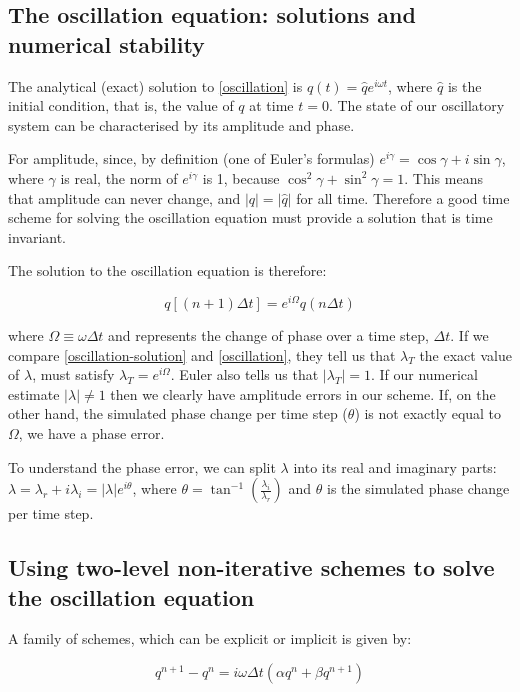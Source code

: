 \subsection{The oscillation equation: solutions and numerical stability}
The analytical (exact) solution to \ref{oscillation} is $q(t) = \hat{q} e^{i \omega t}$, where $\hat{q}$ is the initial condition, that is, the value of $q$ at time $t=0$. The state of our oscillatory system can be characterised by its amplitude and phase.

For amplitude, since, by definition (one of Euler's formulas) $e^{i\gamma} = \cos{\gamma}+i\sin{\gamma}$, where $\gamma$ is real, the norm of $e^{i\gamma}$ is 1, because  $\cos^2{\gamma}+\sin^2{\gamma} =1$. This means that amplitude can never change, and $|q|=|\hat{q}|$ for all time. Therefore a good time scheme for solving the oscillation equation must provide a solution that is time invariant.

The solution to the oscillation equation is therefore:

\begin{equation}
	q [(n+1)\Delta t ] = e^{i\Omega} q(n\Delta t)
	\label{oscillation-solution}
\end{equation}

where $\Omega \equiv \omega \Delta t$ and represents the change of phase over a time step, $\Delta t$. If we compare \ref{oscillation-solution} and \ref{oscillation}, they tell us that $\lambda_T$ the exact value of $\lambda$, must satisfy $\lambda_T=e^{i\Omega} $. Euler also tells us that  $|\lambda_T|=1$. If our numerical estimate $|\lambda|\ne1$ then we clearly have amplitude errors in our scheme. If, on the other hand, the simulated phase change per time step ($\theta$) is not exactly equal to $\Omega$, we have a phase error.

To understand the phase error, we can split $\lambda$ into its real and imaginary parts: $\lambda=\lambda_r + i \lambda_i=|\lambda|e^{i\theta}$, where $\theta = \tan^{-1}\left(\frac{\lambda_i}{\lambda_r}\right)$ and $\theta$ is the simulated phase change per time step.

\subsection{Using two-level non-iterative schemes to solve the oscillation equation}
A family of schemes, which can be explicit or implicit is given by:

\begin{equation}
	q^{n+1}-q^{n} = i \omega \Delta t (\alpha q^n + \beta q^{n+1})
	\label{oscillation-family}
\end{equation}

